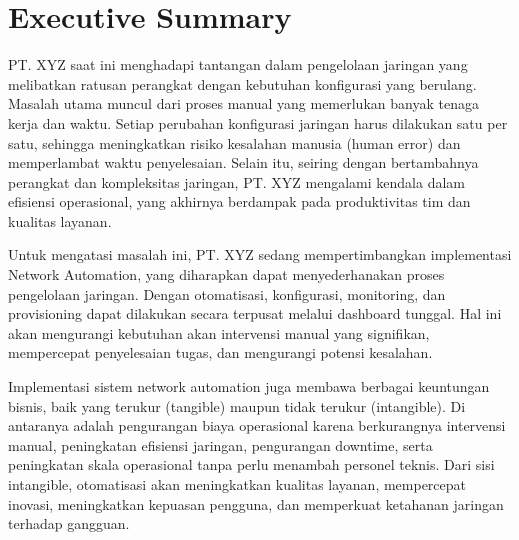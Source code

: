 %
%
%

\chapter*{Executive Summary}

\vspace*{0.2cm}
{
	


PT. XYZ saat ini menghadapi tantangan dalam pengelolaan jaringan yang melibatkan ratusan perangkat dengan kebutuhan konfigurasi yang berulang. Masalah utama muncul dari proses manual yang memerlukan banyak tenaga kerja dan waktu. Setiap perubahan konfigurasi jaringan harus dilakukan satu per satu, sehingga meningkatkan risiko kesalahan manusia (human error) dan memperlambat waktu penyelesaian. Selain itu, seiring dengan bertambahnya perangkat dan kompleksitas jaringan, PT. XYZ mengalami kendala dalam efisiensi operasional, yang akhirnya berdampak pada produktivitas tim dan kualitas layanan.

Untuk mengatasi masalah ini, PT. XYZ sedang mempertimbangkan implementasi Network Automation, yang diharapkan dapat menyederhanakan proses pengelolaan jaringan. Dengan otomatisasi, konfigurasi, monitoring, dan provisioning dapat dilakukan secara terpusat melalui dashboard tunggal. Hal ini akan mengurangi kebutuhan akan intervensi manual yang signifikan, mempercepat penyelesaian tugas, dan mengurangi potensi kesalahan.

Implementasi sistem network automation juga membawa berbagai keuntungan bisnis, baik yang terukur (tangible) maupun tidak terukur (intangible). Di antaranya adalah pengurangan biaya operasional karena berkurangnya intervensi manual, peningkatan efisiensi jaringan, pengurangan downtime, serta peningkatan skala operasional tanpa perlu menambah personel teknis. Dari sisi intangible, otomatisasi akan meningkatkan kualitas layanan, mempercepat inovasi, meningkatkan kepuasan pengguna, dan memperkuat ketahanan jaringan terhadap gangguan.

}
